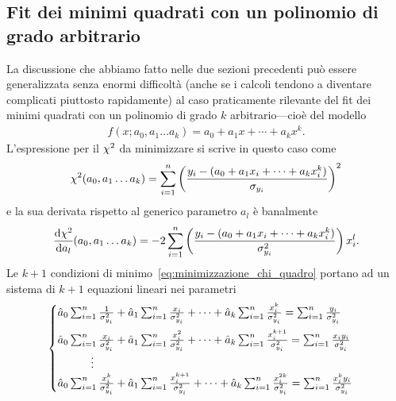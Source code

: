 \subsection{Fit dei minimi quadrati con un polinomio di grado arbitrario}

\danger La discussione che abbiamo fatto nelle due sezioni precedenti può
essere generalizzata senza enormi difficoltà (anche se i calcoli tendono a
diventare complicati piuttosto rapidamente) al caso praticamente rilevante del
fit dei minimi quadrati con un polinomio di grado $k$ arbitrario---cioè
del modello
\begin{align}
  f(x; a_0, a_1 \ldots a_k) = a_0 + a_1 x + \cdots + a_k x^k.
\end{align}
L'espressione per il $\chi^2$ da minimizzare si scrive in questo caso come
\begin{align*}
  \chi^2(a_0, a_1 \ldots a_k) = \sum_{i = 1}^n
  \left( \frac{y_i - (a_0 + a_1 x_i + \cdots + a_k x_i^k)}{\sigma_{y_i}} \right)^2
\end{align*}
e la sua derivata rispetto al generico parametro $a_l$ è banalmente
\begin{align*}
  \td{\chisq}{a_l}{a_0, a_1 \ldots a_k} = -2 \sum_{i = 1}^n
  \left( \frac{y_i - (a_0 + a_1 x_i + \cdots + a_k x_i^k)}{\sigma^2_{y_i}} \right)
  x_i^l.
\end{align*}
Le $k + 1$ condizioni di minimo~\eqref{eq:minimizzazione_chi_quadro} portano
ad un sistema di $k + 1$ equazioni lineari nei parametri
\begin{align}
  \begin{cases}
    \hat{a}_0 \sum_{i = 1}^n \frac{1}{\sigma^2_{y_i}} +
    \hat{a}_1 \sum_{i = 1}^n \frac{x_i}{\sigma^2_{y_i}} + \cdots  +
    \hat{a}_k \sum_{i = 1}^n \frac{x_i^k}{\sigma^2_{y_i}} =
    \sum_{i = 1}^n \frac{y_i}{\sigma^2_{y_i}} \\[8pt]
    \hat{a}_0 \sum_{i = 1}^n \frac{x_i}{\sigma^2_{y_i}} +
    \hat{a}_1 \sum_{i = 1}^n \frac{x_i^2}{\sigma^2_{y_i}} + \cdots  +
    \hat{a}_k \sum_{i = 1}^n \frac{x_i^{k + 1}}{\sigma^2_{y_i}} =
    \sum_{i = 1}^n \frac{x_i y_i}{\sigma^2_{y_i}} \\
    \hspace*{30pt}\vdots \\
    \hat{a}_0 \sum_{i = 1}^n \frac{x_i^k}{\sigma^2_{y_i}} +
    \hat{a}_1 \sum_{i = 1}^n \frac{x_i^{k + 1}}{\sigma^2_{y_i}} + \cdots  +
    \hat{a}_k \sum_{i = 1}^n \frac{x_i^{2k}}{\sigma^2_{y_i}} =
    \sum_{i = 1}^n \frac{x_i^k y_i}{\sigma^2_{y_i}}
   \end{cases}
\end{align}
